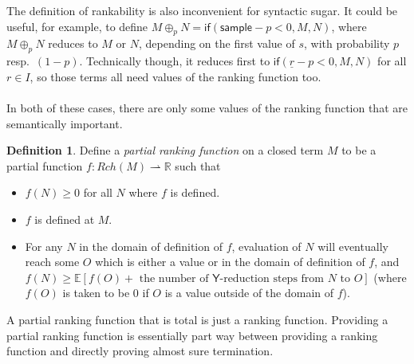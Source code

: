 \documentclass{article}
\newcommand{\tY}{\mathsf{Y}}
\newcommand{\tif}[3]{\mathsf{if}(#1, #2, #3)} %
\newcommand{\tsample}{\mathsf{sample}}
\theoremstyle{definition}
\newtheorem{definition}{Definition}
\theoremstyle{lemma}
\theoremstyle{remark}
\begin{document}
The definition of rankability is also inconvenient for syntactic sugar. It could be useful, for example, to define $M \oplus_p N = \tif{\tsample - p < 0} M N$, where $M \oplus_p N$ reduces to $M$ or $N$, depending on the first value of $s$, with probability $p$ resp.~$(1-p)$. Technically though, it reduces first to $\tif{\underline r - p < 0} M N$ for all $r \in I$, so those terms all need values of the ranking function too.

\paragraph{}
In both of these cases, there are only some values of the ranking function that are semantically important. 
\begin{definition}
Define a \emph{partial ranking function} on a closed term $M$ to be a partial function $f : Rch(M) \rightharpoonup \mathbb R$ such that
\begin{itemize}
    \item $f(N) \geq 0$ for all $N$ where $f$ is defined.
    \item $f$ is defined at $M$.
    \item For any $N$ in the domain of definition of $f$, evaluation of $N$ will eventually  reach some $O$ which is either a value or in the domain of definition of $f$, and $f(N) \geq \mathbb E[f(O) + \text{ the number of $\tY$-reduction steps from $N$ to $O$}]$ (where $f(O)$ is taken to be 0 if $O$ is a value outside of the domain of $f$).
\end{itemize}
\end{definition}
A partial ranking function that is total is just a ranking function. Providing a partial ranking function is essentially part way between providing a ranking function and directly proving almost sure termination.
\end{document}
